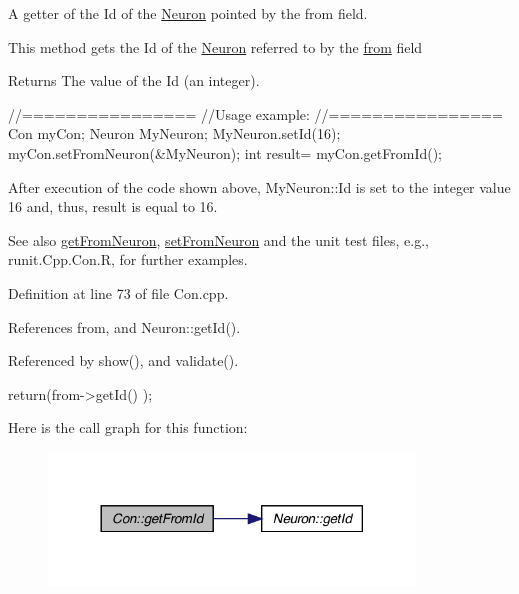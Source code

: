 A getter of the Id of the \hyperlink{class_neuron}{Neuron} pointed by the from field. 

This method gets the Id of the \hyperlink{class_neuron}{Neuron} referred to by the \hyperlink{class_con_a40215fdb25f3b2ed66e965df558e86e2}{from} field \begin{DoxyReturn}{Returns}
The value of the Id (an integer).
\end{DoxyReturn}

\begin{DoxyCode}
  //================
  //Usage example:
  //================
        Con myCon;
        Neuron MyNeuron;
        MyNeuron.setId(16);
        myCon.setFromNeuron(&MyNeuron);
        int result= myCon.getFromId();
\end{DoxyCode}


After execution of the code shown above, MyNeuron::Id is set to the integer value 16 and, thus, result is equal to 16.

\begin{DoxySeeAlso}{See also}
\hyperlink{class_con_a970a74ffcba9433d6f383ecab398f25f}{getFromNeuron}, \hyperlink{class_con_a19ca0a1d257a3f002693a441db03aeb4}{setFromNeuron} and the unit test files, e.g., runit.Cpp.Con.R, for further examples. 
\end{DoxySeeAlso}


Definition at line 73 of file Con.cpp.



References from, and Neuron::getId().



Referenced by show(), and validate().


\begin{DoxyCode}
                    {
        return(from->getId() );
}
\end{DoxyCode}


Here is the call graph for this function:\nopagebreak
\begin{figure}[H]
\begin{center}
\leavevmode
\includegraphics[width=276pt]{class_con_aad72314592bebdcae6c68a67d2b4a505_cgraph}
\end{center}
\end{figure}





